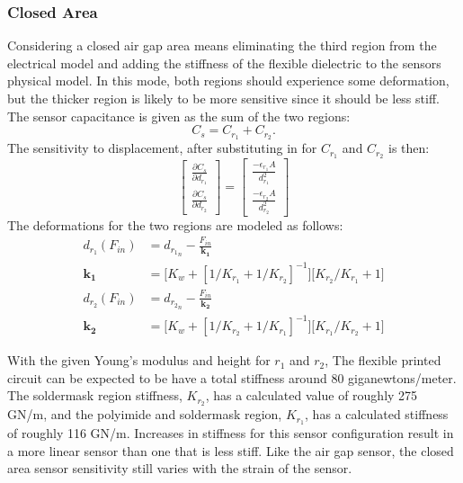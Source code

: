 \subsubsection{Closed Area}

Considering a closed air gap area means eliminating the third region from the electrical model
and adding the stiffness of the flexible dielectric to the sensors physical model.
In this mode, both regions should experience some deformation, but the thicker region is likely
to be more sensitive since it should be less stiff. 
The sensor capacitance is given as the sum of the two regions:
\begin{equation}
C_s = C_{r_1} + C_{r_2}.
\end{equation}
The sensitivity to displacement, after substituting in for $C_{r_1}$ and $C_{r_2}$ is then:
\begin{equation}
\begin{bmatrix}
\frac{\partial C_s}{\partial d_{r_1}} \\[1em]
\frac{\partial C_s}{\partial d_{r_2}} \end{bmatrix} = 
\begin{bmatrix}
\frac{-\epsilon_{r_1} A}{d_{r_1}^2} \\[1em]
\frac{-\epsilon_{r_2} A}{d_{r_2}^2}
\end{bmatrix}
\label{eq:ags}
\end{equation}
The deformations for the two regions are modeled as follows:
\begin{align}
d_{r_1}(F_{in}) &= d_{{r_1}_n} - \frac{F_{in}}{\mathbf{k_1}} \\
\mathbf{k_1} &= \bigg[K_w + [1/K_{r_1} + 1/K_{r_2}]^{-1}\bigg]\bigg[K_{r_2} / K_{r_1} + 1\bigg]
\end{align}
\begin{align}
d_{r_2}(F_{in}) &= d_{{r_2}_n} - \frac{F_{in}}{\mathbf{k_2}} \\
\mathbf{k_2} &= \bigg[K_w + [1/K_{r_2} + 1/K_{r_1}]^{-1}\bigg]\bigg[K_{r_1} / K_{r_2} + 1\bigg]
\end{align}

With the given Young's modulus and height for $r_1$ and $r_2$, The flexible printed circuit 
can be expected to be have a total stiffness around 80 giganewtons/meter. 
The soldermask region stiffness, $K_{r_2}$, has a calculated value of roughly 275 GN/m, and
the polyimide and soldermask region, $K_{r_1}$, has a calculated stiffness of roughly 116 GN/m.
Increases in stiffness for this sensor configuration result in a more linear sensor than one that is less stiff.
Like the air gap sensor, the closed area sensor sensitivity still varies with the strain of the sensor.

